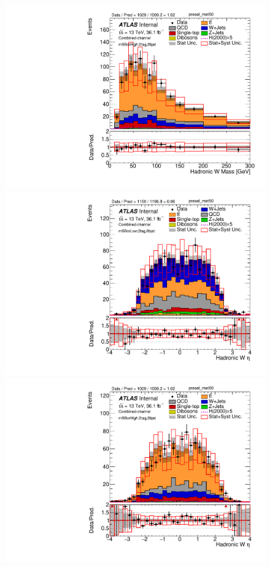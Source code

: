 \begin{figure}[!h]
\begin{center}
\includegraphics[scale=0.33]{./figures/boosted/PlotByMbbRegions/DataMC_2tag_0bjet_mbbcrHigh_lepton_presel_met50_WhadMass}                                                                           
\includegraphics[scale=0.33]{./figures/boosted/PlotByMbbRegions/DataMC_2tag_0bjet_mbbcrLow_lepton_presel_met50_WhadEta}                                                                             
\includegraphics[scale=0.33]{./figures/boosted/PlotByMbbRegions/DataMC_2tag_0bjet_mbbcrHigh_lepton_presel_met50_WhadEta}                                                                            

\end{center}
\end{figure}
